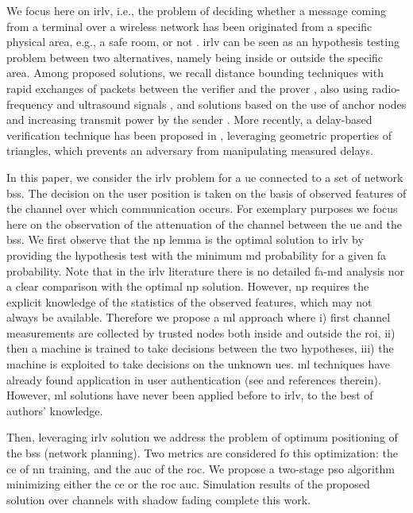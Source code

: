 \documentclass[conference,final]{IEEEtran}
\begin{document}
We focus here on  \ac{irlv}, i.e., the problem of deciding whether a message coming from a terminal over a wireless network has been originated from a specific physical area, e.g., a safe room, or not \cite{Zeng-survey}. \ac{irlv} can be seen as an hypothesis testing problem between two alternatives, namely being inside or outside the specific area. Among proposed solutions, we recall distance bounding techniques with rapid exchanges of packets between the verifier and the prover \cite{Brands}, also using radio-frequency and ultrasound signals \cite{Sastry}, and solutions based on the use of anchor nodes and increasing transmit power by the sender \cite{Vora}. More recently, a delay-based verification technique has been proposed  in \cite{7145434}, leveraging geometric properties of triangles, which prevents an adversary from manipulating measured delays. 

In this paper, we consider the \ac{irlv} problem for a \ac{ue} connected to a set of network \acp{bs}. The decision on the user position is taken on the basis of observed features of the channel over which communication occurs. For exemplary purposes we focus here on the observation of the attenuation of the channel between the \ac{ue} and the \acp{bs}. We first observe that the  \ac{np} lemma \cite{Neyman289} is the optimal solution to \ac{irlv} by providing the hypothesis test with the minimum \ac{md} probability for a given \ac{fa} probability.
Note that in the \ac{irlv} literature there is no detailed \ac{fa}-\ac{md} analysis nor a clear comparison with the optimal \ac{np} solution.
 However, \ac{np}  requires the explicit knowledge of the statistics of the observed features, which may not always be available. Therefore we propose a \ac{ml} approach  where i) first channel measurements are collected by trusted nodes both inside and outside the \ac{roi}, ii) then a machine is trained to take decisions between the two hypotheses, iii) the machine is exploited to take decisions on the unknown \acp{ue}. \ac{ml} techniques have already found application in user authentication (see  \cite{xiao-2018} and references therein). However, \ac{ml} solutions have never been applied before to \ac{irlv}, to the best of authors' knowledge. 

Then, leveraging \ac{irlv} solution we address the problem of optimum positioning of the \acp{bs} (network planning). Two metrics are considered fo this optimization: the \ac{ce} of \ac{nn} training, and the \ac{auc} of the \ac{roc}. We propose a two-stage \ac{pso} algorithm minimizing either the \ac{ce} or the \ac{roc} \ac{auc}. Simulation results of the proposed solution over channels with shadow fading complete this work.
\end{document}
